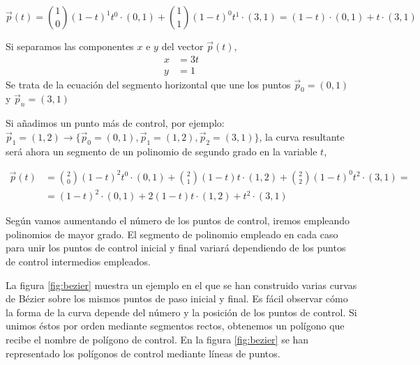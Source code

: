 \begin{equation*}
\vec{p}(t) = \binom{1}{0}\left(1-t\right)^{1}t^0  \cdot (0,1) +  \binom{1}{1}\left(1-t\right)^{0}t^1  \cdot (3,1) = \left(1-t\right)  \cdot (0,1) + t\cdot (3,1)
\end{equation*} 

Si separamos las componentes $x$ e $y$ del vector $\vec{p}(t)$,
\begin{align*}
x &= 3t\\
y &= 1
\end{align*}
Se trata de la ecuación del segmento horizontal que une los puntos $\vec{p}_0 = (0,1)$ y $\vec{p}_n = (3,1)$ 

Si añadimos un punto más de control, por ejemplo:  $\vec{p}_1 = (1,2) \rightarrow \lbrace\vec{p}_0 = (0,1), \vec{p}_1 = (1,2), \vec{p}_2 = (3,1)\rbrace$,  la curva resultante será ahora un segmento de un polinomio de segundo grado en la variable $t$,

\begin{align*}
\vec{p}(t) &= \binom{2}{0}\left(1-t\right)^{2}t^0  \cdot (0,1) +  \binom{2}{1}\left(1-t\right)t \cdot (1,2) + \binom{2}{2}\left(1-t\right)^{0}t^2  \cdot (3,1) =\\
&= \left(1-t\right)^{2} \cdot (0,1) + 2 \left(1-t\right)t \cdot (1,2) + t^2  \cdot (3,1) 
\end{align*} 

Según vamos aumentando el número de los puntos de control, iremos empleando polinomios de mayor grado. El segmento de polinomio empleado en cada caso para unir los puntos de control inicial y final variará dependiendo de los puntos de control intermedios empleados.

La figura \ref{fig:bezier} muestra un ejemplo en el que se han construido varias curvas de Bézier sobre los mismos puntos de paso inicial y final. Es fácil observar cómo la forma de la curva depende del número y la posición de los puntos de control. Si unimos éstos por orden mediante segmentos rectos, obtenemos un polígono que recibe el nombre de polígono de control. En la figura \ref{fig:bezier} se han representado los polígonos de control mediante líneas de puntos.

